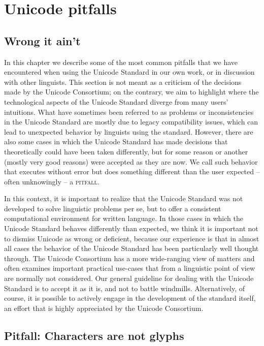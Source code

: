 \chapter{Unicode pitfalls}
\label{unicode-pitfalls}

\section{Wrong it ain't}
\label{wrong-it-is-not}

In this chapter we describe some of the most common pitfalls that we have
encountered when using the Unicode Standard in our own work, or in discussion
with other linguists. This section is not meant as a criticism of the decisions
made by the Unicode Consortium; on the contrary, we aim to highlight where the
technological aspects of the Unicode Standard diverge from many users'
intuitions. What have sometimes been referred to as problems or inconsistencies
in the Unicode Standard are mostly due to legacy compatibility issues, which can
lead to unexpected behavior by linguists using the standard. However, there are
also some cases in which the Unicode Standard has made decisions that
theoretically could have been taken differently, but for some reason or another
(mostly very good reasons) were accepted as they are now. We call such behavior that
executes without error but does something different than the user
expected -- often unknowingly -- a \textsc{pitfall}.

In this context, it is important to realize that the Unicode Standard was not
developed to solve linguistic problems per se, but to offer a consistent
computational environment for written language. In those cases in which the
Unicode Standard behaves differently than expected, we think it is important not
to dismiss Unicode as wrong or deficient, because our
experience is that in almost all cases the behavior of the Unicode Standard has
been particularly well thought through. The Unicode Consortium has a more
wide-ranging view of matters and often examines important practical use-cases
that from a linguistic point of view are normally not considered. Our general
guideline for dealing with the Unicode Standard is to accept it as it is, and
not to battle windmills. Alternatively, of course, it is possible to actively
engage in the development of the standard itself, an effort that is highly
appreciated by the Unicode Consortium.

\section{Pitfall: Characters are not glyphs}
\label{pitfall-characters-are-not-glyphs}

